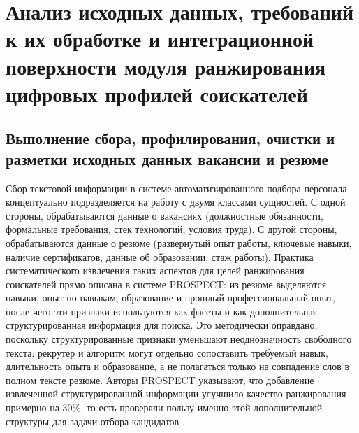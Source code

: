 \chapter{Анализ исходных данных, требований к их обработке и интеграционной поверхности модуля ранжирования цифровых профилей соискателей}
\label{chapter:data}
\section{Выполнение сбора, профилирования, очистки и разметки исходных данных вакансии и резюме}
Сбор текстовой информации в системе автоматизированного подбора персонала концептуально подразделяется на работу с двумя классами сущностей. С одной стороны, обрабатываются данные о вакансиях (должностные обязанности, формальные требования, стек технологий, условия труда). С другой стороны, обрабатываются данные о резюме (развернутый опыт работы, ключевые навыки, наличие сертификатов, данные об образовании, стаж работы). Практика систематического извлечения таких аспектов для целей ранжирования соискателей прямо описана в системе PROSPECT: из резюме выделяются навыки, опыт по навыкам, образование и прошлый профессиональный опыт, после чего эти признаки используются как фасеты и как дополнительная структурированная информация для поиска. Это методически оправдано, поскольку структурированные признаки уменьшают неоднозначность свободного текста: рекрутер и алгоритм могут отдельно сопоставить требуемый навык, длительность опыта и образование, а не полагаться только на совпадение слов в полном тексте резюме. Авторы PROSPECT указывают, что добавление извлеченной структурированной информации улучшило качество ранжирования примерно на 30\%, то есть проверяли пользу именно этой дополнительной структуры для задачи отбора кандидатов \cite{src03}.\par
